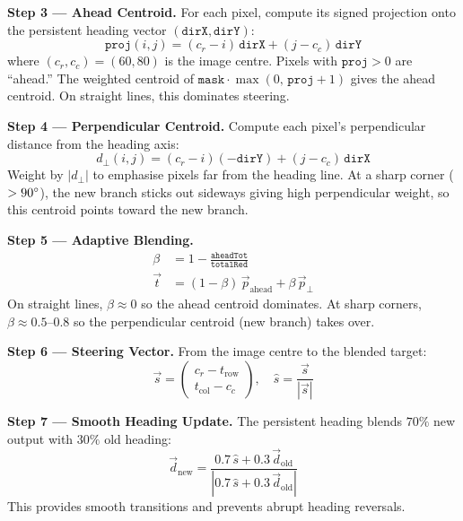 \documentclass[conference, twocolumn]{IEEEtran}
\begin{document}
\textbf{Step 3 --- Ahead Centroid.}
For each pixel, compute its signed projection onto the persistent heading vector $(\texttt{dirX}, \texttt{dirY})$:
\begin{equation}
    \texttt{proj}(i,j) = (c_r - i)\,\texttt{dirX} + (j - c_c)\,\texttt{dirY}
\end{equation}
where $(c_r, c_c) = (60, 80)$ is the image centre. Pixels with $\texttt{proj} > 0$ are ``ahead.'' The weighted centroid of $\texttt{mask} \cdot \max(0,\, \texttt{proj}+1)$ gives the ahead centroid. On straight lines, this dominates steering.

\textbf{Step 4 --- Perpendicular Centroid.}
Compute each pixel's perpendicular distance from the heading axis:
\begin{equation}
    d_\perp(i,j) = (c_r - i)(-\texttt{dirY}) + (j - c_c)\,\texttt{dirX}
\end{equation}
Weight by $|d_\perp|$ to emphasise pixels far from the heading line. At a sharp corner ($>90\degree$), the new branch sticks out sideways giving high perpendicular weight, so this centroid points toward the new branch.

\textbf{Step 5 --- Adaptive Blending.}
\begin{align}
    \beta &= 1 - \frac{\texttt{aheadTot}}{\texttt{totalRed}} \\[4pt]
    \vec{t} &= (1-\beta)\,\vec{p}_{\mathrm{ahead}} + \beta\,\vec{p}_{\perp}
\end{align}
On straight lines, $\beta \approx 0$ so the ahead centroid dominates. At sharp corners, $\beta \approx 0.5$--$0.8$ so the perpendicular centroid (new branch) takes over.

\textbf{Step 6 --- Steering Vector.}
From the image centre to the blended target:
\begin{equation}
    \vec{s} = \begin{pmatrix} c_r - t_{\mathrm{row}} \\ t_{\mathrm{col}} - c_c \end{pmatrix}, \quad
    \hat{s} = \frac{\vec{s}}{|\vec{s}|}
\end{equation}

\textbf{Step 7 --- Smooth Heading Update.}
The persistent heading blends $70\%$ new output with $30\%$ old heading:
\begin{equation}
    \vec{d}_{\mathrm{new}} = \frac{0.7\,\hat{s} + 0.3\,\vec{d}_{\mathrm{old}}}{|0.7\,\hat{s} + 0.3\,\vec{d}_{\mathrm{old}}|}
\end{equation}
This provides smooth transitions and prevents abrupt heading reversals.
\end{document}

